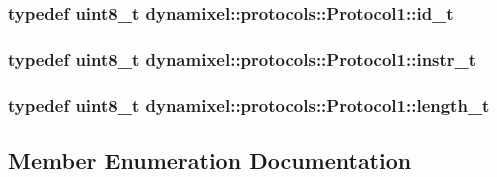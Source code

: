 \subsubsection[{id\+\_\+t}]{\setlength{\rightskip}{0pt plus 5cm}typedef uint8\+\_\+t {\bf dynamixel\+::protocols\+::\+Protocol1\+::id\+\_\+t}}\label{classdynamixel_1_1protocols_1_1_protocol1_a1d4dfa22b01f80b1876d14f539d52b5c}
\hypertarget{classdynamixel_1_1protocols_1_1_protocol1_a572dc8c0871ecdf3d62c4f58fbcfd454}{}
\subsubsection[{instr\+\_\+t}]{\setlength{\rightskip}{0pt plus 5cm}typedef uint8\+\_\+t {\bf dynamixel\+::protocols\+::\+Protocol1\+::instr\+\_\+t}}\label{classdynamixel_1_1protocols_1_1_protocol1_a572dc8c0871ecdf3d62c4f58fbcfd454}
\hypertarget{classdynamixel_1_1protocols_1_1_protocol1_acd6456c39a2f75de2db3d730941027cc}{}
\subsubsection[{length\+\_\+t}]{\setlength{\rightskip}{0pt plus 5cm}typedef uint8\+\_\+t {\bf dynamixel\+::protocols\+::\+Protocol1\+::length\+\_\+t}}\label{classdynamixel_1_1protocols_1_1_protocol1_acd6456c39a2f75de2db3d730941027cc}


\subsection{Member Enumeration Documentation}
\hypertarget{classdynamixel_1_1protocols_1_1_protocol1_a84867f282d00506d43ebca811925fbcc}{}
